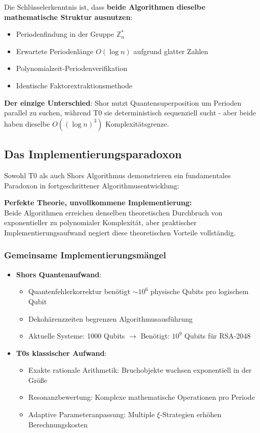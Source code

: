 	Die Schlüsselerkenntnis ist, dass \textbf{beide Algorithmen dieselbe mathematische Struktur ausnutzen}:
	\begin{itemize}
		\item Periodenfindung in der Gruppe $\mathbb{Z}_n^*$
		\item Erwartete Periodenlänge $O(\log n)$ aufgrund glatter Zahlen
		\item Polynomialzeit-Periodenverifikation
		\item Identische Faktorextraktionsmethode
	\end{itemize}
	
	\textbf{Der einzige Unterschied}: Shor nutzt Quantensuperposition um Perioden parallel zu suchen, während T0 sie deterministisch sequenziell sucht - aber beide haben dieselbe $O((\log n)^3)$ Komplexitätsgrenze.
	
	\subsection{Das Implementierungsparadoxon}
	
	Sowohl T0 als auch Shors Algorithmus demonstrieren ein fundamentales Paradoxon in fortgeschrittener Algorithmusentwicklung:
	
	\begin{tcolorbox}[colback=yellow!10,colframe=orange!50,title=Kernproblem]
		\textbf{Perfekte Theorie, unvollkommene Implementierung:} \\
		Beide Algorithmen erreichen denselben theoretischen Durchbruch von exponentieller zu polynomialer Komplexität, aber praktischer Implementierungsaufwand negiert diese theoretischen Vorteile vollständig.
	\end{tcolorbox}
	
	\subsubsection{Gemeinsame Implementierungsmängel}
	\begin{itemize}
		\item \textbf{Shors Quantenaufwand}: 
		\begin{itemize}
			\item Quantenfehlerkorrektur benötigt $\sim 10^6$ physische Qubits pro logischem Qubit
			\item Dekohärenzzeiten begrenzen Algorithmusausführung
			\item Aktuelle Systeme: 1000 Qubits $\rightarrow$ Benötigt: $10^9$ Qubits für RSA-2048
		\end{itemize}
		
		\item \textbf{T0s klassischer Aufwand}:
		\begin{itemize}
			\item Exakte rationale Arithmetik: Bruchobjekte wachsen exponentiell in der Größe
			\item Resonanzbewertung: Komplexe mathematische Operationen pro Periode
			\item Adaptive Parameteranpassung: Multiple $\xi$-Strategien erhöhen Berechnungskosten
		\end{itemize}
	\end{itemize}
	

